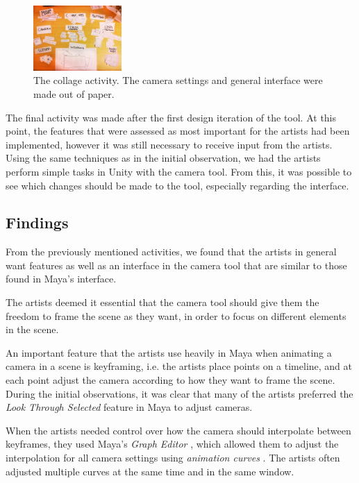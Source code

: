 \begin{figure}[htbp]
\centering
\includegraphics[width=0.3\textwidth]{Pics/labels}
\caption{The collage activity. The camera settings and general interface were made out of paper.}
\label{fig:collage}
\end{figure}

The final activity was made after the first design iteration of the tool. At this point, the features that were assessed as most important for the artists had been implemented, however it was still necessary to receive input from the artists. Using the same techniques as in the initial observation, we had the artists perform simple tasks in Unity with the camera tool. From this, it was possible to see which changes should be made to the tool, especially regarding the interface.

\subsection{Findings} \label{findings}
From the previously mentioned activities, we found that the artists in general want features as well as an interface in the camera tool that are similar to those found in Maya's interface.

The artists deemed it essential that the camera tool should give them the freedom to frame the scene as they want, in order to focus on different elements in the scene.

An important feature that the artists use heavily in Maya when animating a camera in a scene is keyframing, i.e. the artists place points on a timeline, and at each point adjust the camera according to how they want to frame the scene. During the initial observations, it was clear that many of the artists preferred the \textit{Look Through Selected} feature in Maya \cite{maya_lookThrough} to adjust cameras.

When the artists needed control over how the camera should interpolate between keyframes, they used Maya's \textit{Graph Editor} \cite{maya_graph}, which allowed them to adjust the interpolation for all camera settings using \textit{animation curves} \cite{maya_graph}. The artists often adjusted multiple curves at the same time and in the same window.

